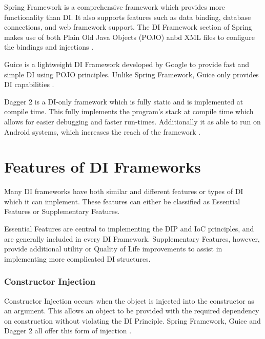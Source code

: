 \documentclass[12pt,twocolumn]{IEEEtran}
\begin{document}
Spring Framework is a comprehensive framework which provides more functionality than DI. It also supports features such as data binding, database connections, and web framework support. The DI Framework section of Spring makes use of both Plain Old Java Objects (POJO) anbd XML files to configure the bindings and injections \cite{spring2019}.

Guice is a lightweight DI Framework developed by Google to provide fast and simple DI using POJO principles. Unlike Spring Framework, Guice only provides DI capabilities \cite{guicewiki2014}.

Dagger 2 is a DI-only framework which is fully static and is implemented at compile time. This fully implements the program's stack at compile time which allows for easier debugging and faster run-times. Additionally it as able to run on Android systems, which increases the reach of the framework \cite{dagger2019}.

\section{Features of DI Frameworks} \label{sec:features}
Many DI frameworks have both similar and different features or types of DI which it can implement. These features can either be classified as Essential Features or Supplementary Features.

Essential Features are central to implementing the DIP and IoC principles, and are generally included in every DI Framework. Supplementary Features, however, provide additional utility or Quality of Life improvements to assist in implementing more complicated DI structures. 


\subsubsection{Constructor Injection} %

Constructor Injection occurs when the object is injected into the constructor as an argument. This allows an object to be provided with the required dependency on construction without violating the DI Principle. Spring Framework, Guice and Dagger 2 all offer this form of injection \cite{guicewiki2014,spring2019,dagger2019}. 
\end{document}
